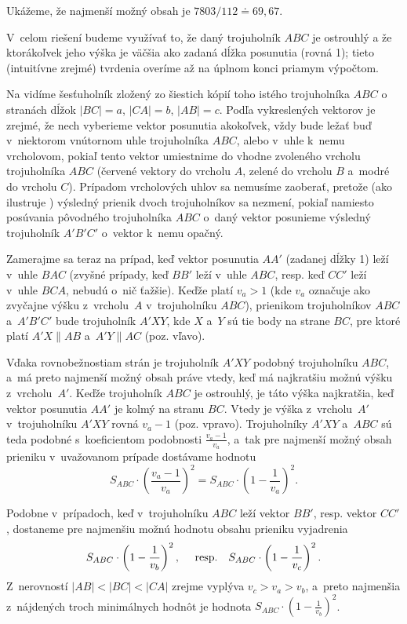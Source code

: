 {%
Ukážeme, že najmenší možný obsah je $7803/112\doteq 69{,}67$.

V~celom riešení budeme využívať to, že daný trojuholník $ABC$ je ostrouhlý a že ktorákoľvek jeho výška je väčšia ako zadaná dĺžka posunutia (rovná 1); tieto (intuitívne zrejmé) tvrdenia overíme až na úplnom konci priamym výpočtom.
%

Na \obrplus\obr{} vidíme šesťuholník zložený zo šiestich kópií toho istého trojuholníka $ABC$ o stranách dĺžok $|BC|=a$, $|CA|=b$, $|AB|=c$.
Podľa vykreslených vektorov je zrejmé, že nech vyberieme vektor posunutia akokoľvek, vždy bude ležať buď v~niektorom vnútornom uhle trojuholníka $ABC$, alebo v~uhle k~nemu vrcholovom, pokiaľ tento vektor umiestnime do vhodne zvoleného vrcholu trojuholníka $ABC$ (červené vektory do vrcholu $A$, zelené do vrcholu $B$ a~modré do vrcholu $C$).
Prípadom vrcholových uhlov sa nemusíme zaoberať, pretože (ako ilustruje \obr) výsledný prienik dvoch trojuholníkov sa nezmení, pokiaľ namiesto posúvania pôvodného trojuholníka $ABC$ o~daný vektor posunieme výsledný trojuholník $A'B'C'$ o~vektor k~nemu opačný.
%

Zamerajme sa teraz na prípad, keď vektor posunutia $AA'$ (zadanej dĺžky 1) leží v~uhle $BAC$ (zvyšné prípady, keď $BB'$ leží v~uhle $ABC$, resp. keď $CC'$ leží v~uhle $BCA$, nebudú o~nič ťažšie).
Keďže platí $v_a>1$ (kde $v_a$ označuje ako zvyčajne výšku z~vrcholu~$A$ v~trojuholníku $ABC$), prienikom trojuholníkov $ABC$ a~$A'B'C'$ bude trojuholník $A'XY$, kde $X$ a~$Y$ sú tie body na strane $BC$, pre ktoré platí $A'X\parallel AB$ a~$A'Y\parallel AC$ (poz. \obr{} vľavo).
%

Vďaka rovnobežnostiam strán je trojuholník $A'XY$ podobný trojuholníku $ABC$, a~má preto najmenší možný obsah práve vtedy, keď má najkratšiu možnú výšku z~vrcholu~$A'$.
Keďže trojuholník $ABC$ je ostrouhlý, je táto výška najkratšia, keď vektor posunutia $AA'$ je kolmý na stranu $BC$.
Vtedy je výška z~vrcholu~$A'$ v~trojuholníku $A'XY$ rovná $v_a-1$ (poz.  vpravo).
Trojuholníky $A'XY$ a~$ABC$ sú teda podobné s~koeficientom podobnosti $\frac{v_a-1}{v_a}$, a~tak pre najmenší možný obsah prieniku v~uvažovanom prípade dostávame hodnotu
$$
S_{ABC}\cdot \left(\frac{v_a-1}{v_a}\right)^2 = S_{ABC}\cdot \left(1-\frac1{v_a}\right)^2.
$$

Podobne v~prípadoch, keď v~trojuholníku $ABC$ leží vektor $BB'$, resp. vektor $CC'$, dostaneme pre najmenšiu možnú hodnotu obsahu prieniku vyjadrenia
$$
S_{ABC}\cdot \left(1-\frac1{v_b}\right)^2,\quad\hbox{ resp.}\quad S_{ABC}\cdot \left(1-\frac1{v_c}\right)^2.
$$
Z~nerovností $|AB|<|BC|<|CA|$ zrejme vyplýva $v_c>v_a>v_b$, a~preto najmenšia z~nájdených troch minimálnych hodnôt je hodnota
$S_{ABC}\cdot \left(1-\frac1{v_b}\right)^2$.

}
